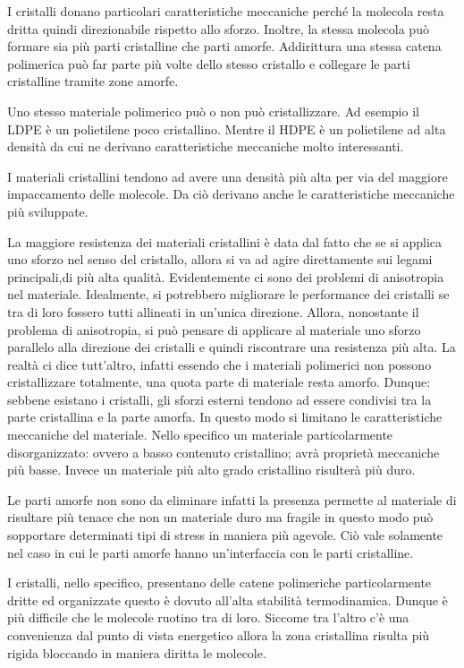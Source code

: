 I cristalli donano particolari caratteristiche meccaniche perché la molecola resta dritta quindi direzionabile rispetto allo sforzo.
Inoltre, la stessa molecola può formare sia più parti cristalline che parti amorfe. Addirittura una stessa catena polimerica può far parte più volte dello stesso cristallo e collegare le parti cristalline tramite zone amorfe.

Uno stesso materiale polimerico può o non può cristallizzare. Ad esempio il \ac{LDPE} è un polietilene poco cristallino. Mentre il \ac{HDPE} è un polietilene ad alta densità da cui ne derivano caratteristiche meccaniche molto interessanti.

I materiali cristallini tendono ad avere una densità più alta per via del maggiore impaccamento delle molecole. Da ciò derivano anche le caratteristiche meccaniche più sviluppate. 

La maggiore resistenza dei materiali cristallini è data dal fatto che se si applica uno sforzo nel senso del cristallo, allora si va ad agire direttamente sui legami principali,di più alta qualità. Evidentemente ci sono dei problemi di anisotropia nel materiale.
Idealmente, si potrebbero migliorare le performance dei cristalli se tra di loro fossero tutti allineati in un'unica direzione. Allora, nonostante il problema di anisotropia, si può pensare di applicare al materiale uno sforzo parallelo alla direzione dei cristalli e quindi riscontrare una resistenza più alta.
La realtà ci dice tutt'altro, infatti essendo che i materiali polimerici non possono cristallizzare totalmente, una quota parte di materiale resta amorfo. Dunque: sebbene esistano i cristalli, gli sforzi esterni tendono ad essere condivisi tra la parte cristallina e la parte amorfa. In questo modo si limitano le caratteristiche meccaniche del materiale.
Nello specifico un materiale particolarmente disorganizzato: ovvero a basso contenuto cristallino; avrà proprietà meccaniche più basse. Invece un materiale più alto grado cristallino risulterà più duro.

Le parti amorfe non sono da eliminare infatti la presenza permette al materiale di risultare più tenace che non un materiale duro ma fragile in questo modo può sopportare determinati tipi di stress in maniera più agevole.
Ciò vale solamente nel caso in cui le parti amorfe hanno un'interfaccia con le parti cristalline.

I cristalli, nello specifico, presentano delle catene polimeriche particolarmente dritte ed organizzate questo è dovuto all'alta stabilità termodinamica. Dunque è più difficile che le molecole ruotino tra di loro. Siccome tra l'altro c'è una convenienza dal punto di vista energetico allora la zona cristallina risulta più rigida bloccando in maniera diritta le molecole.

